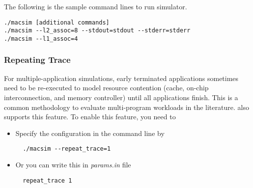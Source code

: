 The following is the sample command lines to run \SIM simulator.

\smallskip
\begin{lstlisting}
./macsim [additional commands]
./macsim --l2_assoc=8 --stdout=stdout --stderr=stderr
./macsim --l1_assoc=4 
\end{lstlisting}
\smallskip



\subsubsection{Repeating Trace}

For multiple-application simulations, early terminated applications
sometimes need to be re-executed to model resource contention (cache,
on-chip interconnection, and memory controller) until all applications
finish. This is a common methodology to evaluate multi-program
workloads in the literature. \SIM also supports this feature. To
enable this feature, you need to

\begin{itemize}
  \item Specify the configuration in the command line by
  \smallskip
  \begin{lstlisting}
  ./macsim --repeat_trace=1
  \end{lstlisting}
  \smallskip

  \item Or you can write this in \textit{params.in} file
  \smallskip
  \begin{lstlisting}
  repeat_trace 1
  \end{lstlisting}
  \smallskip
\end{itemize}



 

